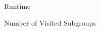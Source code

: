 \documentclass{article}
\begin{document}
    \begin{preview}
        Runtime
    \end{preview}

    \begin{preview}
        
    \end{preview}

    \begin{preview}
        Number of Visited Subgroups
    \end{preview}

    \begin{preview}
        
    \end{preview}
\end{document}

